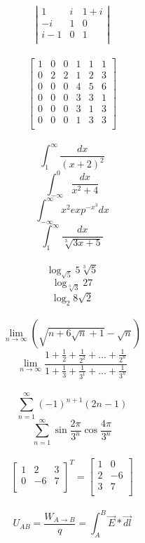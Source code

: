 \documentclass[a4paper]{article}
\begin{document}
$$ 
\left|
\begin{array}{ccc}
1 & i & 1+i \\
-i & 1 & 0\\
i-1 & 0 & 1\\
\end{array}\right| $$\\

$$
\left[ \begin{array}{c|cc|ccc}
1 & 0 & 0 & 1 & 1 & 1\\
\hline
0 & 2 & 2 & 1 & 2 & 3\\
0 & 0 & 0 & 4 & 5 & 6\\
\hline
0 & 0 & 0 & 3 & 3 & 1\\
0 & 0 & 0 & 3 & 1 & 3\\
0 & 0 & 0 & 1 & 3 & 3\\
\end{array} \right]
$$\\

$$
\int_{1}^{\infty} \frac{dx}{(x+2)^2} $$
$$
\int_{- \infty}^{0} \frac{dx}{x^{2}+4} $$
$$
\int_{- \infty}^{\infty} x^{2}exp^{-x^{3}}dx $$
$$
\int_{1}^{\infty} \frac{dx}{\sqrt[3]{3x+5}} $$\\

$$
\log_{\sqrt{5}}5\sqrt[3]{5} $$
$$
\log_{\sqrt[3]{3}}27 $$
$$
\log_{2}8\sqrt{2} $$\\

$$
\lim_{n \rightarrow \infty}(\sqrt{n+6\sqrt{n}+1}-\sqrt{n}) $$
$$
\lim_{n \to \infty} \frac{1 + \frac{1}{2} + \frac{1}{2^2} + ... + \frac{1}{2^n}}{1 + \frac{1}{3} + \frac{1}{3^1} + ... + \frac{1}{3^n}} $$\\

$$
\sum_{n=1}^{\infty}(-1)^{n+1}(2n-1) $$
$$
\sum_{n=1}^{\infty} \sin \frac{2\pi}{3^n} \cos \frac{4\pi}{3^n} $$\\

$$
\left[ \begin{array}{ccc}
1 & 2 & 3 \\
0 & -6 & 7 \\
\end{array} \right]^{T} 
=
\left[ \begin{array}{cc}
1 & 0\\
2 & -6\\
3 & 7\\
\end{array} \right]
$$\\


$$
U_{AB}=\frac{W_{A \to B}}{q}=\int_{A}^{B}\vec{E}*\vec{dl} $$\\
\end{document}
